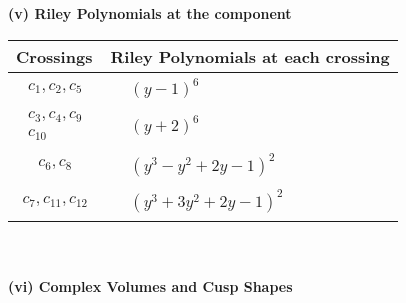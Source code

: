 \documentclass[1p]{elsarticle_modified}
\theoremstyle{definition}
\begin{document}
\newpage\renewcommand{\arraystretch}{1}
\flushleft \textbf{(v) Riley Polynomials at the component}\newline \\
\begin{tabular}{m{50pt}|m{274pt}}
Crossings & \hspace{64pt}Riley Polynomials at each crossing \\
\hline $$\begin{aligned}c_{1},c_{2},c_{5}\end{aligned}$$&$\begin{aligned}
&(y-1)^6
\end{aligned}$\\
\hline $$\begin{aligned}c_{3},c_{4},c_{9}\\c_{10}\end{aligned}$$&$\begin{aligned}
&(y+2)^6
\end{aligned}$\\
\hline $$\begin{aligned}c_{6},c_{8}\end{aligned}$$&$\begin{aligned}
&(y^3- y^2+2 y-1)^2
\end{aligned}$\\
\hline $$\begin{aligned}c_{7},c_{11},c_{12}\end{aligned}$$&$\begin{aligned}
&(y^3+3 y^2+2 y-1)^2
\end{aligned}$\\
\hline
\end{tabular}\\~\\
\newpage\flushleft \textbf{(vi) Complex Volumes and Cusp Shapes}
\end{document}
